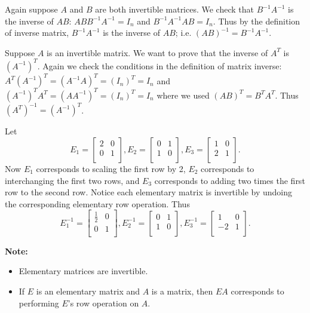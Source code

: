 \documentclass[12pt,letterpaper]{article}
\begin{document}
\begin{enumerate}
\begin{enumerate}
	\Part Again suppose $A$ and $B$ are both invertible matrices. We check that $B^{-1}A^{-1}$ is the inverse of $AB$: $ABB^{-1}A^{-1}=I_n$ and $B^{-1}A^{-1}AB=I_n$. Thus by the definition of inverse matrix, $B^{-1}A^{-1}$ is the inverse of $AB$; i.e. $(AB)^{-1}=B^{-1}A^{-1}$.
	
	\Part Suppose $A$ is an invertible matrix. We want to prove that the inverse of $A^{T}$ is $(A^{-1})^{T}$. Again we check the conditions in the definition of matrix inverse: $A^{T}(A^{-1})^{T}=(A^{-1}A)^{T}=(I_n)^{T}=I_n$ and $(A^{-1})^{T}A^{T}=(AA^{-1})^{T}=(I_n)^{T}=I_n$ where we used $(AB)^{T}=B^{T}A^{T}$. Thus $(A^{T})^{-1}=(A^{-1})^{T}$.
	
\end{enumerate}
  
  \Answer Let $$E_1=\begin{bmatrix} 2 & 0 \\ 0 & 1\\ \end{bmatrix}, E_2=\begin{bmatrix} 0 & 1\\ 1 &0\\ \end{bmatrix}, E_3=\begin{bmatrix}
  1 &0\\ 2 & 1\\ \end{bmatrix}.$$ Now $E_1$ corresponds to scaling the first row by 2, $E_2$ corresponds to interchanging the first two rows, and $E_3$ corresponds to adding two times the first row to the second row. Notice each elementary matrix is invertible by undoing the corresponding elementary row operation. Thus $$E_1^{-1}=\begin{bmatrix} \frac{1}{2} & 0 \\ 0 & 1\\ \end{bmatrix}, E_2^{-1}=\begin{bmatrix} 0 & 1\\ 1 &0\\ \end{bmatrix}, E_3^{-1}=\begin{bmatrix}
  1 &0\\ -2 & 1\\ \end{bmatrix}.$$
  
  \newpage
  
  {\bf Note:}
  \begin{itemize}
  	\item Elementary matrices are invertible.
  	\item If $E$ is an elementary matrix and $A$ is a matrix, then $EA$ corresponds to performing $E$'s row operation on $A$.
  \end{itemize}
  

\end{enumerate}
\end{document}
